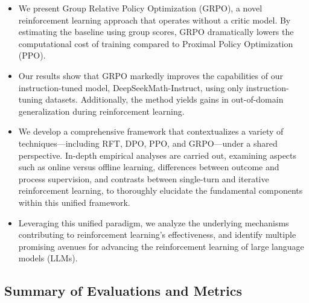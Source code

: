 \begin{itemize}[topsep=0pt]
    \item We present Group Relative Policy Optimization (GRPO), a novel reinforcement learning approach that operates without a critic model. By estimating the baseline using group scores, GRPO dramatically lowers the computational cost of training compared to Proximal Policy Optimization (PPO).
    \item Our results show that GRPO markedly improves the capabilities of our instruction-tuned model, DeepSeekMath-Instruct, using only instruction-tuning datasets. Additionally, the method yields gains in out-of-domain generalization during reinforcement learning.
    \item We develop a comprehensive framework that contextualizes a variety of techniques—including RFT, DPO, PPO, and GRPO—under a shared perspective. In-depth empirical analyses are carried out, examining aspects such as online versus offline learning, differences between outcome and process supervision, and contrasts between single-turn and iterative reinforcement learning, to thoroughly elucidate the fundamental components within this unified framework.
    \item Leveraging this unified paradigm, we analyze the underlying mechanisms contributing to reinforcement learning’s effectiveness, and identify multiple promising avenues for advancing the reinforcement learning of large language models (LLMs).
\end{itemize}

\subsection{Summary of Evaluations and Metrics}

